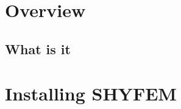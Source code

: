 \documentclass{report}
\newcommand{\todo}[1]{This section still has to be written by #1}
\begin{document}
\newpage










\chapter{Overview}

	\section{What is it}
	







\chapter{Installing SHYFEM}
\end{document}
